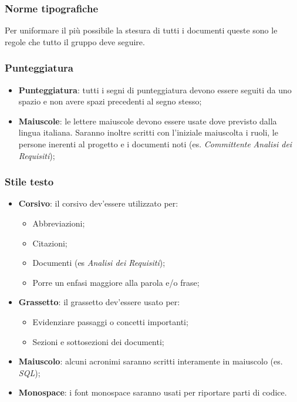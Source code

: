 \documentclass{scalatekids-article}
\begin{document}
\subsubsection{Norme tipografiche}
Per uniformare il più possibile la stesura di tutti i documenti queste sono le regole che tutto il gruppo deve seguire.

\subsubsection{Punteggiatura}
\begin{itemize}
\item \textbf{Punteggiatura}: tutti i segni di punteggiatura devono essere seguiti da uno spazio e non avere spazi precedenti al segno stesso;
\item \textbf{Maiuscole}: le lettere maiuscole devono essere usate dove previsto dalla lingua italiana.
  Saranno inoltre scritti con l'iniziale maiuscolta i ruoli, le persone inerenti al progetto e i documenti noti (es. \textit{Committente} \textit{Analisi dei Requisiti});
\end{itemize}

\subsubsection{Stile testo}
\begin{itemize}
\item \textbf{Corsivo}: il corsivo dev'essere utilizzato per:
  \begin{itemize}
  \item Abbreviazioni;
  \item Citazioni;
  \item Documenti (es \textit{Analisi dei Requisiti});
  \item Porre un enfasi maggiore alla parola e/o frase;
  \end{itemize}
\item \textbf{Grassetto}: il grassetto dev'essere usato per:
  \begin{itemize}
  \item Evidenziare passaggi o concetti importanti;
  \item Sezioni e sottosezioni dei documenti;
  \end{itemize}
\item \textbf{Maiuscolo}: alcuni acronimi saranno scritti interamente in maiuscolo (es. \textit{SQL});
\item \textbf{Monospace}: i font monospace saranno usati per riportare parti di codice.
\end{itemize}
\end{document}
